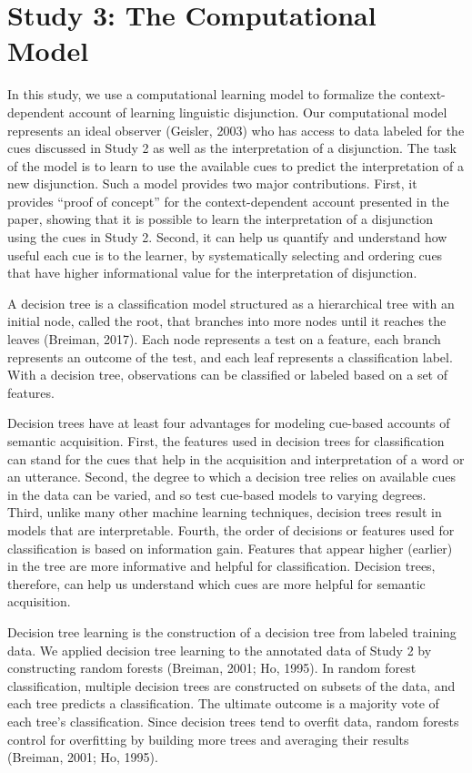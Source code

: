 \documentclass[
  ,man,floatsintext]{apa6}
\begin{document}
\hypertarget{study-3-the-computational-model}{%
\section{Study 3: The Computational Model}\label{study-3-the-computational-model}}

In this study, we use a computational learning model to formalize the context-dependent account of learning linguistic disjunction. Our computational model represents an ideal observer (Geisler, 2003) who has access to data labeled for the cues discussed in Study 2 as well as the interpretation of a disjunction. The task of the model is to learn to use the available cues to predict the interpretation of a new disjunction. Such a model provides two major contributions. First, it provides ``proof of concept'' for the context-dependent account presented in the paper, showing that it is possible to learn the interpretation of a disjunction using the cues in Study 2. Second, it can help us quantify and understand how useful each cue is to the learner, by systematically selecting and ordering cues that have higher informational value for the interpretation of disjunction.

A decision tree is a classification model structured as a hierarchical tree with an initial node, called the root, that branches into more nodes until it reaches the leaves (Breiman, 2017). Each node represents a test on a feature, each branch represents an outcome of the test, and each leaf represents a classification label. With a decision tree, observations can be classified or labeled based on a set of features.

Decision trees have at least four advantages for modeling cue-based accounts of semantic acquisition. First, the features used in decision trees for classification can stand for the cues that help in the acquisition and interpretation of a word or an utterance. Second, the degree to which a decision tree relies on available cues in the data can be varied, and so test cue-based models to varying degrees. Third, unlike many other machine learning techniques, decision trees result in models that are interpretable. Fourth, the order of decisions or features used for classification is based on information gain. Features that appear higher (earlier) in the tree are more informative and helpful for classification. Decision trees, therefore, can help us understand which cues are more helpful for semantic acquisition.

Decision tree learning is the construction of a decision tree from labeled training data. We applied decision tree learning to the annotated data of Study 2 by constructing random forests (Breiman, 2001; Ho, 1995). In random forest classification, multiple decision trees are constructed on subsets of the data, and each tree predicts a classification. The ultimate outcome is a majority vote of each tree's classification. Since decision trees tend to overfit data, random forests control for overfitting by building more trees and averaging their results (Breiman, 2001; Ho, 1995).
\end{document}

